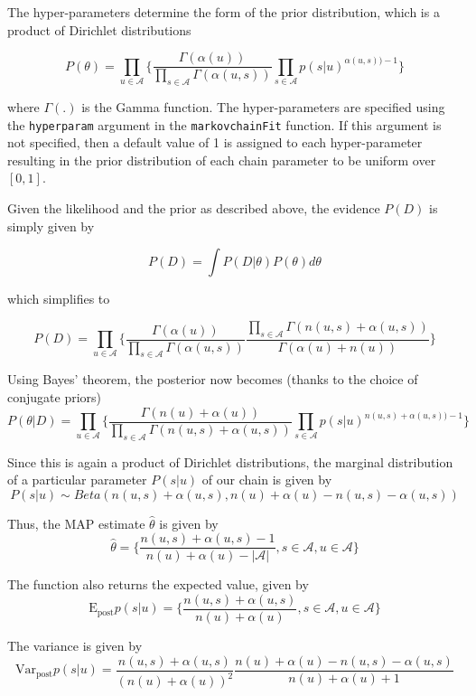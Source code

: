 \documentclass[
  nojss]{jss}
\begin{document}
The hyper-parameters determine the form of the prior distribution, which is a product of Dirichlet distributions

\[P(\theta) = \prod_{u \in \mathcal{A}} \Big\{ \frac{\Gamma(\alpha(u))}{\prod_{s \in \mathcal{A}} \Gamma(\alpha(u, s))} \prod_{s \in \mathcal{A}} p(s|u)^{\alpha(u, s)) - 1} \Big\}\]

where \(\Gamma(.)\) is the Gamma function. The hyper-parameters are specified using the \texttt{hyperparam} argument in the \texttt{markovchainFit} function. If this argument is not specified, then a default value of 1 is assigned to each hyper-parameter resulting in the prior distribution of each chain parameter to be uniform over \([0,1]\).

Given the likelihood and the prior as described above, the evidence \(P(D)\) is simply given by

\[P(D) = \int P(D|\theta) P(\theta) d\theta\]

which simplifies to

\[
P(D) = \prod_{u \in \mathcal{A}} \Big\{ \frac{\Gamma(\alpha(u))}{\prod_{s \in \mathcal{A}} \Gamma(\alpha(u, s))} \frac{\prod_{s \in \mathcal{A}} \Gamma(n(u, s) + \alpha(u, s))}{\Gamma(\alpha(u) + n(u))} \Big\}
\]

Using Bayes' theorem, the posterior now becomes (thanks to the choice of conjugate priors)
\[
P(\theta | D) = \prod_{u \in \mathcal{A}} \Big\{ \frac{\Gamma(n(u) + \alpha(u))}{\prod_{s \in \mathcal{A}} \Gamma(n(u, s) + \alpha(u, s))} \prod_{s \in \mathcal{A}} p(s|u)^{n(u, s) + \alpha(u, s)) - 1} \Big\}
\]

Since this is again a product of Dirichlet distributions, the marginal distribution of a particular parameter \(P(s|u)\) of our chain is given by
\[
P(s|u) \sim Beta(n(u, s) + \alpha(u, s), n(u) + \alpha(u) - n(u, s) - \alpha(u, s))
\]

Thus, the MAP estimate \(\hat{\theta}\) is given by
\[
\hat{\theta} = \Big\{ \frac{n(u, s) + \alpha(u, s) - 1}{n(u) + \alpha(u) - |\mathcal{A}|}, s \in \mathcal{A}, u \in \mathcal{A} \Big\}
\]

The function also returns the expected value, given by
\[
\text{E}_{\text{post}} p(s|u) = \Big\{ \frac{n(u, s) + \alpha(u, s)}{n(u) + \alpha(u)}, s \in \mathcal{A}, u \in \mathcal{A} \Big\}
\]

The variance is given by
\[
\text{Var}_{\text{post}} p(s|u) = \frac{n(u, s) + \alpha(u, s)}{(n(u) + \alpha(u))^2} \frac{n(u) + \alpha(u) - n(u, s) - \alpha(u, s)}{n(u) + \alpha(u) + 1}
\]
\end{document}
